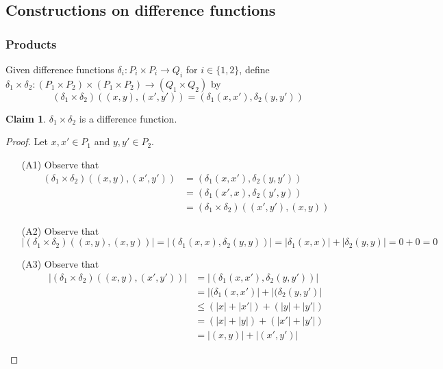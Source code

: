 \documentclass[acmsmall,review,anonymous]{acmart}\settopmatter{printfolios=true,printccs=false,printacmref=false}
\theoremstyle{definition}
\newtheorem{claim}{Claim}
\begin{document}
\subsection{Constructions on difference functions}
\subsubsection{Products}
Given difference functions $\delta_i: P_i \times P_i \longrightarrow Q_i$ for
$i \in \{1,2\}$, define $\delta_1 \times \delta_2 :(P_1 \times P_2) \times
(P_1 \times P_2) \longrightarrow (Q_1 \times Q_2)$ by
$$(\delta_1 \times \delta_2)((x, y), (x', y')) = (\delta_1(x, x'), \delta_2(y,
y'))$$
\begin{claim}
$\delta_1 \times \delta_2$ is a difference function.
\end{claim}
\begin{proof}
Let $x, x' \in P_1$ and $y, y' \in P_2$.
\begin{enumerate}
  \item[(A1)]
  Observe that
  \begin{align*}
(\delta_1 \times \delta_2)((x, y), (x', y')) &= (\delta_1(x, x'),
\delta_2(y, y'))\\
&= (\delta_1(x', x), \delta_2(y', y))\\
&= (\delta_1 \times \delta_2)((x', y'), (x, y))
\end{align*}
\item[(A2)] Observe that
$$|(\delta_1 \times \delta_2)((x, y), (x, y))| = |(\delta_1(x, x),
\delta_2(y, y))| = |\delta_1(x, x)| + |\delta_2(y,y)| = 0 + 0 = 0$$
\item[(A3)]
Observe that
\begin{align*}
|(\delta_1 \times \delta_2)((x, y), (x', y'))| &= |(\delta_1(x, x'),
\delta_2(y, y'))|\\
&= |(\delta_1(x, x')| + |(\delta_2(y, y')|\\
&\leq (|x| + |x'|) + (|y| + |y'|)\\
&= (|x| + |y|) + (|x'| + |y'|)\\
&= |(x, y)| + |(x', y')|
\end{align*}
\end{enumerate}
\end{proof}
\end{document}
